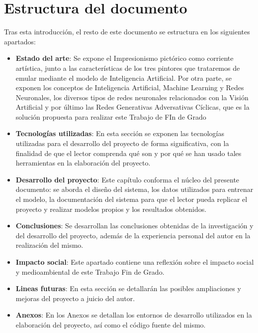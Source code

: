 \documentclass[../main.tex]{subfiles}
\begin{document}
\section{Estructura del documento}
Tras esta introducción, el resto de este documento se estructura en los siguientes apartados:
\begin{itemize}
    \item \textbf{Estado del arte}: Se expone el Impresionismo pictórico como corriente artística, junto a las características de los tres pintores que trataremos de emular mediante el modelo de Inteligencia Artificial. Por otra parte, se exponen los conceptos de Inteligencia Artificial, Machine Learning y Redes Neuronales, los diversos tipos de redes neuronales relacionados con la Visión Artificial y por último las Redes Generativas Adversativas Cíclicas, que es la solución propuesta para realizar este Trabajo de FIn de Grado
    \item \textbf{Tecnologías utilizadas}: En esta sección se exponen las tecnologías utilizadas para el desarrollo del proyecto de forma significativa, con la finalidad de que el lector comprenda qué son y por qué se han usado tales herramientas en la elaboración del proyecto.
    \item \textbf{Desarrollo del proyecto}: Este capítulo conforma el núcleo del presente documento: se aborda el diseño del sistema, los datos utilizados para entrenar el modelo, la documentación del sistema para que el lector pueda replicar el proyecto y realizar modelos propios y los resultados obtenidos.
    \item \textbf{Conclusiones}: Se desarrollan las conclusiones obtenidas de la investigación y del desarrollo del proyecto, además de la experiencia personal del autor en la realización del mismo.
    \item \textbf{Impacto social}: Este apartado contiene una reflexión sobre el impacto social y medioambiental de este Trabajo Fin de Grado.
    \item \textbf{Lineas futuras}: En esta sección se detallarán las posibles ampliaciones y mejoras del proyecto a juicio del autor. 
    \item \textbf{Anexos}: En los Anexos se detallan los entornos de desarrollo utilizados en la elaboración del proyecto, así como el código fuente del mismo.
\end{itemize}
\end{document}

